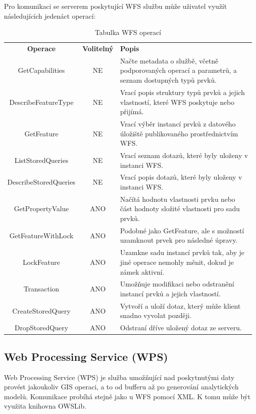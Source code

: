 \documentclass[a4paper,oneside,12pt]{book}
\begin{document}
\hspace{10mm} Pro komunikaci se serverem poskytující WFS službu může uživatel využít následujících jedenáct operací:

\begin{table}[htbp]
  \centering
  \caption{Tabulka WFS operací} 
  \label{tab:WFS}
  \begin{tabular}{|c|c|p{7cm}|}
    \hline
    \textbf{Operace} & \textbf{Volitelný} & \textbf{Popis} \\
    \hhline{=|=|=}
    GetCapabilities & NE & Načte metadata o službě, včetně podporovaných operací a parametrů, a seznam dostupných typů prvků. \\
    \hline
    DescribeFeatureType & NE & Vrací popis struktury typů prvků a jejich vlastností, které WFS poskytuje nebo přijímá. \\
    \hline
    GetFeature & NE & Vrací výběr instancí prvků z datového úložiště publikovaného prostřednictvím WFS. \\
    \hline
    ListStoredQueries & NE & Vrací seznam dotazů, které byly uloženy v instanci WFS. \\
    \hline
    DescribeStoredQueries & NE & Vrací popis dotazů, které byly uloženy v instanci WFS. \\
    \hline
    GetPropertyValue & ANO & Načítá hodnotu vlastnosti prvku nebo část hodnoty složité vlastnosti pro sadu prvků. \\
    \hline
    GetFeatureWithLock & ANO & Podobné jako GetFeature, ale s možností uzamknout prvek pro následné úpravy. \\
    \hline
    LockFeature & ANO & Uzamkne sadu instancí prvků tak, aby je jiné operace nemohly měnit, dokud je zámek aktivní. \\
    \hline
    Transaction & ANO & Umožňuje modifikaci nebo odstranění instancí prvků a jejich vlastností. \\
    \hline
    CreateStoredQuery & ANO & Vytvoří a uloží dotaz, který může klient snadno vyvolat později. \\
    \hline
    DropStoredQuery & ANO & Odstraní dříve uložený dotaz ze serveru. \\
    \hline
  \end{tabular}
\end{table}

\subsection{Web Processing Service (WPS)} \label{wps}
\hspace{10mm}Web Processing Service (WPS) je služba umožňující nad poskytnutými daty provést jakoukoliv GIS operaci, a to od bufferu až po generování analytických modelů. Komunikace probíhá stejně jako u WFS pomocí XML. K tomu může být využita knihovna OWSLib.
\end{document}

